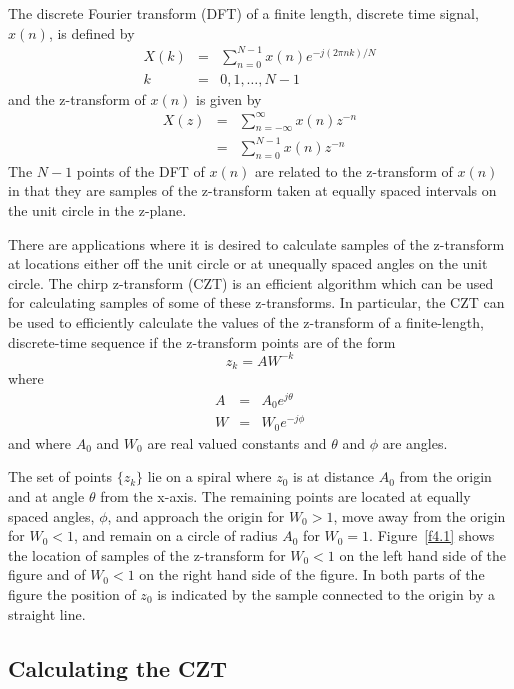 	The discrete Fourier transform (DFT) of a finite length,
discrete time signal, $x(n)$, is defined by
%
\begin{eqnarray}
X(k) &=& \sum_{n=0}^{N-1}x(n)e^{-j(2\pi nk)/N}\\
k&=&0,1,\ldots,N-1\nonumber
\label{e4.1}
\end{eqnarray}
%
and the z-transform of $x(n)$ is given by
%
\begin{eqnarray}
X(z) &=& \sum_{n=-\infty}^{\infty}x(n)z^{-n}\nonumber\\
     &=& \sum_{n=0}^{N-1}x(n)z^{-n}
\label{e4.2}
\end{eqnarray}
%
The $N-1$ points of the DFT
of $x(n)$ are related to the z-transform of $x(n)$ in that
they are samples of the z-transform taken at equally spaced
intervals on the unit circle in the z-plane.

	There are applications \cite{czt} where it is desired to calculate
samples of the z-transform at locations either off the unit circle or at
unequally spaced angles on the unit circle.  The chirp
z-transform (CZT) is an efficient algorithm which can be used
for calculating samples of some of these z-transforms.  In particular,
the CZT can be used to efficiently calculate the values of the
z-transform of a finite-length, discrete-time sequence if the
z-transform points are of the form
%
\begin{equation}
z_k = AW^{-k}
\label{e4.3a}
\end{equation}
%
where
%
\begin{eqnarray}
A   &=& A_0e^{j\theta}\nonumber\\
W   &=& W_0e^{-j\phi}
\label{e4.3}
\end{eqnarray}
%
and where $A_0$ and $W_0$ are real valued constants and $\theta$ and $\phi$
are angles.
%

The set of points $\{z_k\}$ lie on a spiral where
$z_0$ is at distance $A_0$ from the origin and at angle
$\theta$ from the x-axis.  The remaining points are located
at equally spaced angles, $\phi$, and approach the origin for
$W_0>1$, move away from the origin for $W_0<1$, and remain
on a circle of radius $A_0$ for $W_0=1$.  Figure~\ref{f4.1}
shows the location of samples of the z-transform for $W_0< 1$
on the left hand side of the figure and of
$W_0<1$ on the right hand side of the figure. In both parts of the
figure the position of 
$z_0$ is indicated by the sample connected to the origin by a straight
line.
\subsection{Calculating the CZT}

